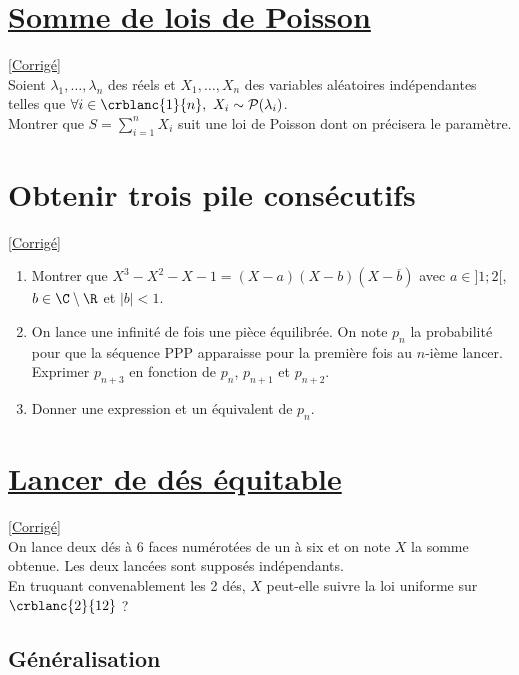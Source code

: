 \documentclass[8pt]{book}
\begin{document}
\section{\underline{Somme de lois de Poisson} }
\label{Somme de lois de Poisson}
\textcolor{blue}{\hyperref[Somme de lois de Poisson corrigé]{[Corrigé]}}\\
Soient $\lambda_1,\dots,\lambda_n$ des réels et $X_1,\dots,X_n$ des variables aléatoires indépendantes telles que $\forall i\in \crblanc{1}{n},\ X_i\sim\mathcal P(\lambda_i)$.\\
Montrer que $S=\displaystyle\sum_{i=1}^nX_i$ suit une loi de Poisson dont on précisera le paramètre.

\section{Obtenir trois pile consécutifs }
\label{Obtenir trois pile consécutifs}
\textcolor{blue}{\hyperref[Obtenir trois pile consécutifs corrigé]{[Corrigé]}}\\
\begin{enumerate}
	\item Montrer que $X^3-X^2-X-1=(X-a)(X-b)(X-\overline{b})$ avec $a\in]1;2[$, $b\in\C\setminus\R$ et $|b|<1$.
	\item On lance une infinité de fois une pièce équilibrée. On note $p_n$ la probabilité pour que la séquence PPP apparaisse pour la première fois au $n$-ième lancer. Exprimer $p_{n+3}$ en fonction de $p_n$, $p_{n+1}$ et $p_{n+2}$.
	\item Donner une expression et un équivalent de $p_n$.
\end{enumerate}

\section{\underline{Lancer de dés équitable} }
\label{Lancer de dés équitable}
\textcolor{blue}{\hyperref[Lancer de dés équitable corrigé]{[Corrigé]}}\\
On lance deux dés à 6 faces numérotées de un à six et on note $X$ la somme obtenue. Les deux lancées sont supposés indépendants.
\\ En truquant convenablement les 2 dés, $X$ peut-elle suivre la loi uniforme sur $\crblanc{2}{12}$ ?

\subsection{Généralisation }
\end{document}
